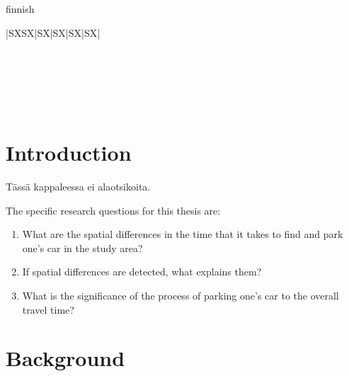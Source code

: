 \documentclass[a4paper,11pt]{article}
\newcommand\Tstrut{\rule{0pt}{2.2ex}}       %
\newcommand\Bstrut{\rule[-4.0ex]{0pt}{0pt}} %
\newcommand{\TBstrut}{\Tstrut\Bstrut}       %
\begin{document}
\begin{spacing}{1}
\begin{otherlanguage*}{finnish}
\begin{tabularx}{\linewidth}{|S{X}S{X}|S{X}|S{X}|S{X}|S{X}|}
     \TBstrut\\
    \hline
     \TBstrut\\
    \hline
     \TBstrut\\
    \Xhline{3\arrayrulewidth}
\end{tabularx}
\end{otherlanguage*}
\end{spacing}

\newpage
{}
\thispagestyle{empty}
\renewcommand*\contentsname{Table of contents} %
\tableofcontents

\newpage
\setcounter{page}{1} %
\section{Introduction}
\justify
Tässä kappaleessa ei alaotsikoita.

The specific research questions for this thesis are:

\begin{spacing}{1}
\begin{enumerate}[label=\Roman*] %
  \item What are the spatial differences in the time that it takes to find and park one’s car in the study area?
  \item If spatial differences are detected, what explains them?
  \item What is the significance of the process of parking one’s car to the overall travel time?
\end{enumerate}
\end{spacing}

\newpage
\section{Background}
\end{document}
